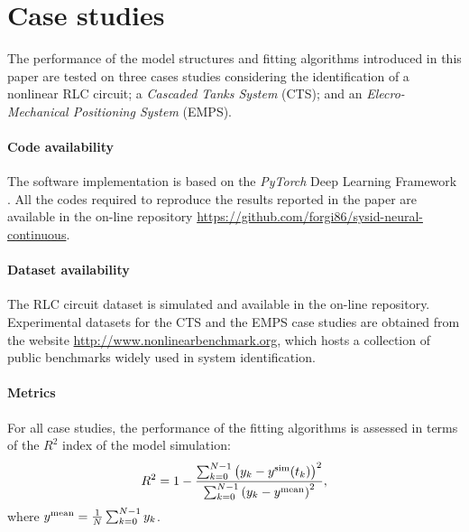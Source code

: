 \documentclass{article} %
\newcommand{\nsamp}{N}
\newcommand{\simul}[1]{{#1}^{\rm sim}}
\begin{document}
\section{Case studies}
\label{sec:example}
The performance of the model structures and fitting algorithms introduced in this paper are tested  on  three cases studies considering the identification of a nonlinear RLC circuit; a  \emph{Cascaded Tanks System} (CTS); and  an \emph{Elecro-Mechanical Positioning System} (EMPS). 

\paragraph{Code availability} 
The software implementation is based on the \emph{PyTorch} Deep Learning Framework \citep{paszke:2017automatic}.
All the codes required to reproduce the results reported in the paper are available in the on-line repository \url{https://github.com/forgi86/sysid-neural-continuous}. 

\paragraph{Dataset availability} 
The RLC circuit dataset is simulated and available in the on-line repository. Experimental datasets for the CTS and the EMPS case studies are obtained from the  website \url{http://www.nonlinearbenchmark.org}, which hosts a collection of public benchmarks widely used in system identification. 

\paragraph{Metrics}
 For all case studies,  the performance of the fitting algorithms is assessed in terms of the $R^2$ index of the model simulation:
\begin{equation*}
R^2 = 1 - \frac{\sum_{k=0}^{\nsamp-1} \left(y_k - \simul{y}(t_k)\right)^2}{\sum_{k=0}^{\nsamp-1} \left(y_k - y^{\rm mean}\right)^2},
\end{equation*}
where $y^{\rm mean} = \frac{1}{N}\sum_{k=0}^{\nsamp-1} y_k$.  
\end{document}
